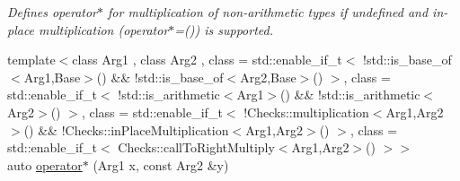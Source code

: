 \begin{DoxyCompactItemize}
\begin{DoxyCompactList}\small\item\em Defines operator$\ast$ for multiplication of non-\/arithmetic types if undefined and in-\/place multiplication (operator$\ast$=()) is supported. \end{DoxyCompactList}\item 
\hypertarget{namespaceRFFGen_a5a5346beba60bcf5a97585baa6d62e72}{{\footnotesize template$<$class Arg1 , class Arg2 , class  = std\-::enable\-\_\-if\-\_\-t$<$ !std\-::is\-\_\-base\-\_\-of$<$\-Arg1,\-Base$>$() \&\& !std\-::is\-\_\-base\-\_\-of$<$\-Arg2,\-Base$>$() $>$, class  = std\-::enable\-\_\-if\-\_\-t$<$ !std\-::is\-\_\-arithmetic$<$\-Arg1$>$() \&\& !std\-::is\-\_\-arithmetic$<$\-Arg2$>$() $>$, class  = std\-::enable\-\_\-if\-\_\-t$<$ !\-Checks\-::multiplication$<$\-Arg1,\-Arg2$>$() \&\&                                       !\-Checks\-::in\-Place\-Multiplication$<$\-Arg1,\-Arg2$>$() $>$, class  = std\-::enable\-\_\-if\-\_\-t$<$ Checks\-::call\-To\-Right\-Multiply$<$\-Arg1,\-Arg2$>$() $>$$>$ }\\auto \hyperlink{namespaceRFFGen_a5a5346beba60bcf5a97585baa6d62e72}{operator$\ast$} (Arg1 x, const Arg2 \&y)}\label{namespaceRFFGen_a5a5346beba60bcf5a97585baa6d62e72}


\end{DoxyCompactItemize}
